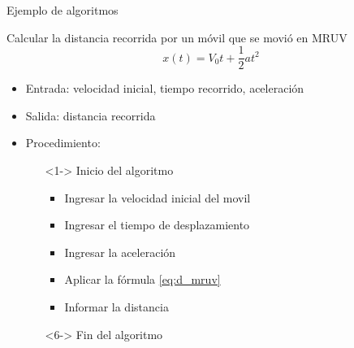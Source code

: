 \documentclass[xcolor=pdftex,table,11pt]{beamer}
\begin{document}
\begin{frame}{Ejemplo de algoritmos}

\begin{block}{Calcular la distancia recorrida por un móvil que se movió en MRUV}
    \begin{equation}\label{eq:d_mruv}
            x(t) = V_0 t + \frac{1}{2}  a  t^2  
    \end{equation}
   \begin{itemize}
   \item Entrada: velocidad inicial, tiempo recorrido, aceleración
   \item Salida: distancia recorrida
   \item Procedimiento: 
   \begin{itemize}
   \item[]<1-> Inicio del algoritmo

   \begin{itemize}
   
     	\item<1-> Ingresar la velocidad inicial del movil
        \item<2-> Ingresar el tiempo de desplazamiento
 		\item<3-> Ingresar la aceleración
 		\item<4-> Aplicar la fórmula \ref{eq:d_mruv}
 		\item<5-> Informar la distancia
   \end{itemize}
 \item[]<6-> Fin del algoritmo

	\end{itemize}
\end{itemize}

\end{block}


\end{frame}
\end{document}
